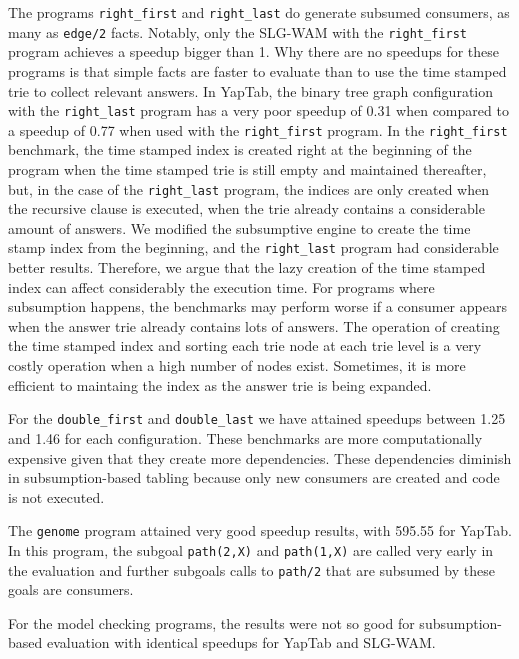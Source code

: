The programs \texttt{right\_first} and \texttt{right\_last} do generate subsumed consumers,
as many as \texttt{edge/2} facts. Notably, only the SLG-WAM with the \texttt{right\_first} program
achieves a speedup bigger than 1. Why there are no speedups for these programs is that simple facts
are faster to evaluate than to use the time stamped trie to collect relevant answers.
In YapTab, the binary tree graph configuration with the \texttt{right\_last} program has a very poor speedup
of 0.31 when compared to a speedup of 0.77 when used with the \texttt{right\_first} program.
In the \texttt{right\_first} benchmark, the time stamped index is created right at
the beginning of the program when the time stamped trie is still empty and maintained thereafter, but,
in the case of the \texttt{right\_last} program, the indices are only created when the recursive
clause is executed, when the trie already contains a considerable amount of answers. We modified the subsumptive
engine to create the time stamp index from the beginning, and the \texttt{right\_last} program had considerable
better results. Therefore, we argue that the lazy creation of the time stamped index can affect considerably the
execution time. For programs where subsumption happens, the benchmarks may perform worse if a consumer appears
when the answer trie already contains lots of answers. The operation of creating the time stamped index
and sorting each trie node at each trie level is a very costly operation when a high number of nodes exist.
Sometimes, it is more efficient to maintaing the index as the answer trie is being expanded.

For the \texttt{double\_first} and \texttt{double\_last} we have attained speedups between 1.25 and 1.46
for each configuration. These benchmarks are more computationally expensive given that they create more
dependencies. These dependencies diminish in subsumption-based tabling because only new consumers are created
and code is not executed.

The \texttt{genome} program attained very good speedup results, with
595.55 for YapTab. In this program, the subgoal \texttt{path(2,X)} and \texttt{path(1,X)} are called
very early in the evaluation and further subgoals calls to \texttt{path/2} that are subsumed by these
goals are consumers.

For the model checking programs, the results were not so good for subsumption-based evaluation with
identical speedups for YapTab and SLG-WAM.




